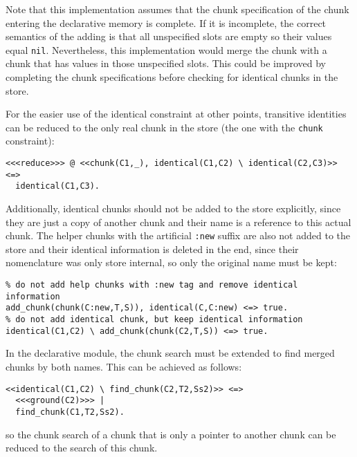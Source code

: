 Note that this implementation assumes that the chunk specification of the chunk entering the declarative memory is complete. If it is incomplete, the correct semantics of the adding is that all unspecified slots are empty so their values equal \lstinline|nil|. Nevertheless, this implementation would merge the chunk with a chunk that has values in those unspecified slots. This could be improved by completing the chunk specifications before checking for identical chunks in the store.

For the easier use of the identical constraint at other points, transitive identities can be reduced to the only real chunk in the store (the one with the \lstinline|chunk| constraint):

\begin{lstlisting}
<<<reduce>>> @ <<chunk(C1,_), identical(C1,C2) \ identical(C2,C3)>> <=> 
  identical(C1,C3).
\end{lstlisting}

Additionally, identical chunks should not be added to the store explicitly, since they are just a copy of another chunk and their name is a reference to this actual chunk. The helper chunks with the artificial \lstinline|:new| suffix are also not added to the store and their identical information is deleted in the end, since their nomenclature was only store internal, so only the original name must be kept:

\begin{lstlisting}
% do not add help chunks with :new tag and remove identical information
add_chunk(chunk(C:new,T,S)), identical(C,C:new) <=> true. 
% do not add identical chunk, but keep identical information
identical(C1,C2) \ add_chunk(chunk(C2,T,S)) <=> true. 
\end{lstlisting}

In the declarative module, the chunk search must be extended to find merged chunks by both names. This can be achieved as follows:

\enlargethispage{-\baselineskip}

\begin{lstlisting}
<<identical(C1,C2) \ find_chunk(C2,T2,Ss2)>> <=> 
  <<<ground(C2)>>> | 
  find_chunk(C1,T2,Ss2).
\end{lstlisting}

so the chunk search of a chunk that is only a pointer to another chunk can be reduced to the search of this chunk. 

